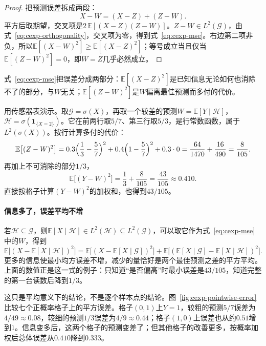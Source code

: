 \begin{proof}
把预测误差拆成两段：
\[
 X-W=(X-Z)+(Z-W).
\]
平方后取期望，交叉项是$2\,\mathbb{E}[(X-Z)(Z-W)]$。$Z-W\in L^{2}(\mathcal{G})$，由式~\eqref{eq:cexp-orthogonality}，交叉项为零，得到式~\eqref{eq:cexp-mse}。右边第二项非负，所以$\mathbb{E}[(X-W)^{2}]\geq\mathbb{E}[(X-Z)^{2}]$；等号成立当且仅当$\mathbb{E}[(Z-W)^{2}]=0$，即$W=Z$几乎必然成立。
\end{proof}

式~\eqref{eq:cexp-mse}把误差分成两部分：$\mathbb{E}[(X-Z)^{2}]$是已知信息无论如何也消除不了的部分，与$W$无关；$\mathbb{E}[(Z-W)^{2}]$是$W$偏离最佳预测而多付的代价。

用传感器表演示。取$\mathcal{G}=\sigma(X)$，再取一个较差的预测$W=\mathbb{E}[Y\mid\mathcal{H}]$，$\mathcal{H}=\sigma(\mathbf{1}_{\{X=2\}})$。它在前两行取$5/7$、第三行取$5/3$，是行常数函数，属于$L^{2}(\sigma(X))$。按行计算多付的代价：
\[
 \mathbb{E}\bigl[(Z-W)^{2}\bigr]=0.3\Bigl(\frac13-\frac57\Bigr)^{2}+0.4\Bigl(1-\frac57\Bigr)^{2}+0.3\cdot0=\frac{64}{1470}+\frac{16}{490}=\frac{8}{105}.
\]
再加上不可消除的部分$1/3$，
\[
 \mathbb{E}\bigl[(Y-W)^{2}\bigr]=\frac13+\frac{8}{105}=\frac{43}{105}\approx0.410 .
\]
直接按格子计算$(Y-W)^{2}$的加权和，也得到$43/105$。

\paragraph{信息多了，误差平均不增}
若$\mathcal{H}\subseteq\mathcal{G}$，则$\mathbb{E}[X\mid\mathcal{H}]\in L^{2}(\mathcal{H})\subseteq L^{2}(\mathcal{G})$，可以取它作为式~\eqref{eq:cexp-mse}中的$W$，得到
\begin{equation}
 \mathbb{E}\bigl[(X-\mathbb{E}[X\mid\mathcal{H}])^{2}\bigr]=\mathbb{E}\bigl[(X-\mathbb{E}[X\mid\mathcal{G}])^{2}\bigr]+\mathbb{E}\bigl[(\mathbb{E}[X\mid\mathcal{G}]-\mathbb{E}[X\mid\mathcal{H}])^{2}\bigr].
 \label{eq:cexp-information-monotone}
\end{equation}
更多的信息使最小均方误差不增，减少的量恰好是两个最佳预测之差的平方平均。上面的数值正是这一式的例子：只知道“是否偏高”时最小误差是$43/105$，知道完整的第一台读数后降到$1/3$。

这只是平均意义下的结论，不是逐个样本点的结论。图~\ref{fig:cexp-pointwise-error}比较七个正概率格子上的平方误差。格子$(0,1)$上$Y=1$，较粗的预测$5/7$误差为$4/49\approx0.08$，较细的预测$1/3$误差为$4/9\approx0.44$；格子$(1,0)$上误差也从约$0.51$增到$1$。信息变多后，这两个格子的预测变差了；但其他格子的改善更多，按概率加权后总体误差从$0.410$降到$0.333$。

